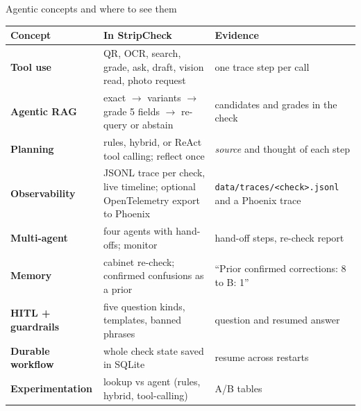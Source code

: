 \documentclass[aspectratio=169,11pt]{beamer}
\begin{document}
\begin{frame}{Agentic concepts and where to see them}
\scriptsize
\renewcommand{\arraystretch}{1.05}
\begin{tabularx}{\textwidth}{@{}>{\bfseries}l X X@{}}
\toprule
Concept & In StripCheck & Evidence \\
\midrule
Tool use & QR, OCR, search, grade, ask, draft, vision read, photo request & one trace step per call \\
Agentic RAG & exact $\rightarrow$ variants $\rightarrow$ grade 5 fields $\rightarrow$ re-query or abstain & candidates and grades in the check \\
Planning & rules, hybrid, or ReAct tool calling; reflect once & \emph{source} and thought of each step \\
Observability & JSONL trace per check, live timeline; optional OpenTelemetry export to Phoenix & \texttt{data/traces/<check>.jsonl} and a Phoenix trace \\
Multi-agent & four agents with hand-offs; monitor & hand-off steps, re-check report \\
Memory & cabinet re-check; confirmed confusions as a prior & ``Prior confirmed corrections: 8 to B: 1'' \\
HITL + guardrails & five question kinds, templates, banned phrases & question and resumed answer \\
Durable workflow & whole check state saved in SQLite & resume across restarts \\
Experimentation & lookup vs agent (rules, hybrid, tool-calling) & A/B tables \\
\bottomrule
\end{tabularx}
\end{frame}
\end{document}
